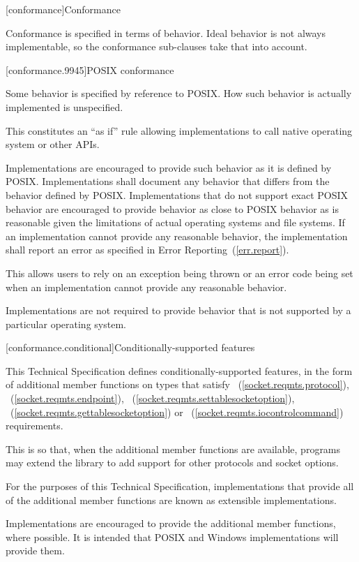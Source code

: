 
[conformance]{Conformance}

\pnum
 Conformance is specified in terms of behavior. Ideal behavior is not always implementable, so the conformance sub-clauses take that into account.


[conformance.9945]{POSIX conformance}

\pnum
 Some behavior is specified by reference to POSIX. How such behavior is actually implemented is unspecified.

\pnum
 \begin{note} This constitutes an ``as if'' rule allowing implementations to call native operating system or other APIs. \end{note}

\pnum
Implementations are encouraged to provide such behavior as it is defined by POSIX. Implementations shall document any behavior that differs from the behavior defined by POSIX. Implementations that do not support exact POSIX behavior are encouraged to provide behavior as close to POSIX behavior as is reasonable given the limitations of actual operating systems and file systems. If an implementation cannot provide any reasonable behavior, the implementation shall report an error as specified in Error Reporting~(\ref{err.report}).

\pnum
 \begin{note} This allows users to rely on an exception being thrown or an error code being set when an implementation cannot provide any reasonable behavior. \end{note}

\pnum
 Implementations are not required to provide behavior that is not supported by a particular operating system.



[conformance.conditional]{Conditionally-supported features}

\pnum
This Technical Specification defines conditionally-supported features, in the form of additional member functions on types that satisfy ~(\ref{socket.reqmts.protocol}), ~(\ref{socket.reqmts.endpoint}), ~(\ref{socket.reqmts.settablesocketoption}), ~(\ref{socket.reqmts.gettablesocketoption}) or ~(\ref{socket.reqmts.iocontrolcommand}) requirements.

\pnum
 \begin{note} This is so that, when the additional member functions are available, \Cpp programs may extend the library to add support for other protocols and socket options. \end{note}

\pnum
For the purposes of this Technical Specification, implementations that provide all of the additional member functions are known as extensible implementations.

\pnum
 \begin{note} Implementations are encouraged to provide the additional member functions, where possible. It is intended that POSIX and Windows implementations will provide them. \end{note}



